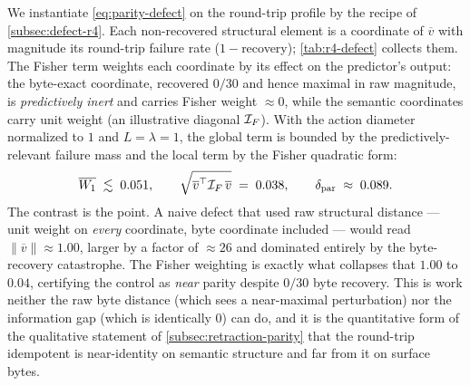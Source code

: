 \begin{example}
\label{ex:r4-defect}
We instantiate \eqref{eq:parity-defect} on the round-trip profile by the recipe of
\cref{subsec:defect-r4}. Each non-recovered structural element is a coordinate of
$\overline{v}$ with magnitude its round-trip failure rate ($1-$recovery);
\cref{tab:r4-defect} collects them. The Fisher term weights each coordinate by
its effect on the predictor's output: the byte-exact coordinate, recovered
$0/30$ and hence maximal in raw magnitude, is \emph{predictively inert} and
carries Fisher weight $\approx 0$, while the semantic coordinates carry unit
weight (an illustrative diagonal $\mathcal{I}_{F}$). With the action diameter normalized
to $1$ and $L=\lambda=1$, the global term is bounded by the predictively-relevant
failure mass and the local term by the Fisher quadratic form:
\[
  \overline{W_{1}} \;\lesssim\; 0.051,
  \qquad
  \sqrt{\overline{v}^\top\mathcal{I}_{F}\,\overline{v}} \;=\; 0.038,
  \qquad
  \delta_{\mathrm{par}} \;\approx\; 0.089 .
\]
The contrast is the point. A naive defect that used raw structural distance ---
unit weight on \emph{every} coordinate, byte coordinate included --- would read
$\|\overline{v}\|\approx 1.00$, larger by a factor of $\approx 26$ and dominated
entirely by the byte-recovery catastrophe. The Fisher weighting is exactly what
collapses that $1.00$ to $0.04$, certifying the control as \emph{near} parity
despite $0/30$ byte recovery. This is work neither the raw byte distance (which
sees a near-maximal perturbation) nor the information gap (which is identically
$0$) can do, and it is the quantitative form of the qualitative statement of
\cref{subsec:retraction-parity} that the round-trip idempotent is near-identity
on semantic structure and far from it on surface bytes.
\end{example}


